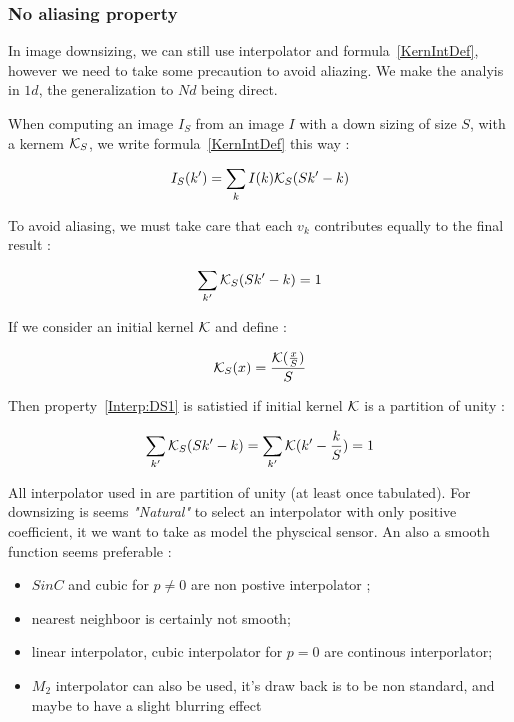 \subsubsection{No aliasing property}

In image downsizing, we can still use interpolator and formula~\ref{KernIntDef},
however we need to take some precaution to  avoid aliazing. We make the analyis
in $1d$, the generalization to $Nd$ being direct.

When computing an image $I_S$ from an image $I$ with a  
down sizing of size $S$, with a kernem $\mathcal K_S$, we write formula~\ref{KernIntDef}  this way :

\begin{equation}
     I_S(k') =   \sum_{k}  I(k)  \mathcal K_S(S k'-k)   
\end{equation}

To avoid aliasing, we must take care that each $v_k$ contributes equally to the final result :

\begin{equation}
    \sum_{k'}  \mathcal K_S(S k'-k)  = 1 \label{Interp:DS1}
\end{equation}

If we consider an initial kernel $\mathcal K$ and define :

\begin{equation}
    \mathcal K_S(x) = \frac{\mathcal K(\frac{x}{S})}{S}
\end{equation}


Then property~\ref{Interp:DS1} is  satistied if initial kernel $\mathcal K$ is
a partition of unity :

\begin{equation}
    \sum_{k'}  \mathcal K_S(S k'-k)  =  \sum_{k'}  \mathcal K( k'-\frac{k}{S})  = 1
\end{equation}

All interpolator used in \PPP are partition of unity (at least once tabulated).
For downsizing is seems  \emph{"Natural"} to select an interpolator with only positive
coefficient, it we want to take as model the physcical sensor.  An also a smooth
function seems preferable :

\begin{itemize}
    \item $SinC$ and cubic for  $p \neq 0$ are non postive interpolator ;
    \item  nearest neighboor is certainly not smooth;
    \item  linear interpolator, cubic interpolator for $p=0$ are continous interporlator;
    \item  $M_2$ interpolator can also be used, it's draw back is to be non standard,
           and maybe to have a slight blurring effect
\end{itemize}


